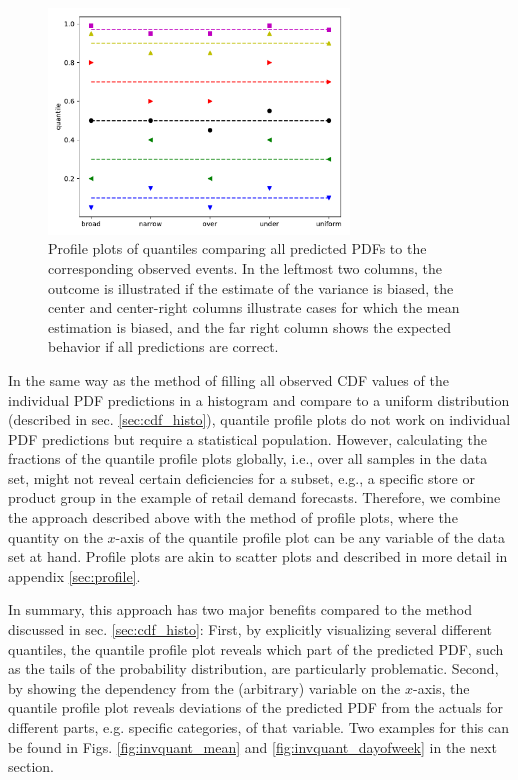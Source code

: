 \documentclass[BCOR=1mm, DIV=calc,10pt,
twoside=true,
twocolumn,
headings=normal]{scrartcl}
\begin{document}
\begin{figure}
\begin{center}
\includegraphics[width=8cm]{../figures/invquant_example}
\caption{\label{fig:invquant_example} Profile plots of quantiles comparing all predicted PDFs to the corresponding observed events. In the leftmost two columns, the outcome is illustrated if the estimate of the variance is biased, the center and center-right columns illustrate cases for which the mean estimation is biased, and the far right column shows the expected behavior if all predictions are correct.}
\end{center}
\end{figure}

In the same way as the method of filling all observed CDF values of the individual PDF predictions in a histogram and compare to a uniform distribution (described in sec. \ref{sec:cdf_histo}), quantile profile plots do not work on individual PDF predictions but require a statistical population. However, calculating the fractions of the quantile profile plots globally, i.e., over all samples in the data set, might not reveal certain deficiencies for a subset, e.g., a specific store or product group in the example of retail demand forecasts. Therefore, we combine the approach described above with the method of profile plots, where the quantity on the $x$-axis of the quantile profile plot can be any variable of the data set at hand. Profile plots are akin to scatter plots and described in more detail in appendix \ref{sec:profile}.

In summary, this approach has two major benefits compared to the method discussed in sec. \ref{sec:cdf_histo}: First, by explicitly visualizing several different quantiles, the quantile profile plot reveals which part of the predicted PDF, such as the tails of the probability distribution, are particularly problematic. Second, by showing the dependency from the (arbitrary) variable on the $x$-axis, the quantile profile plot reveals deviations of the predicted PDF from the actuals for different parts, e.g. specific categories, of that variable. Two examples for this can be found in Figs. \ref{fig:invquant_mean} and \ref{fig:invquant_dayofweek} in the next section.
\end{document}
